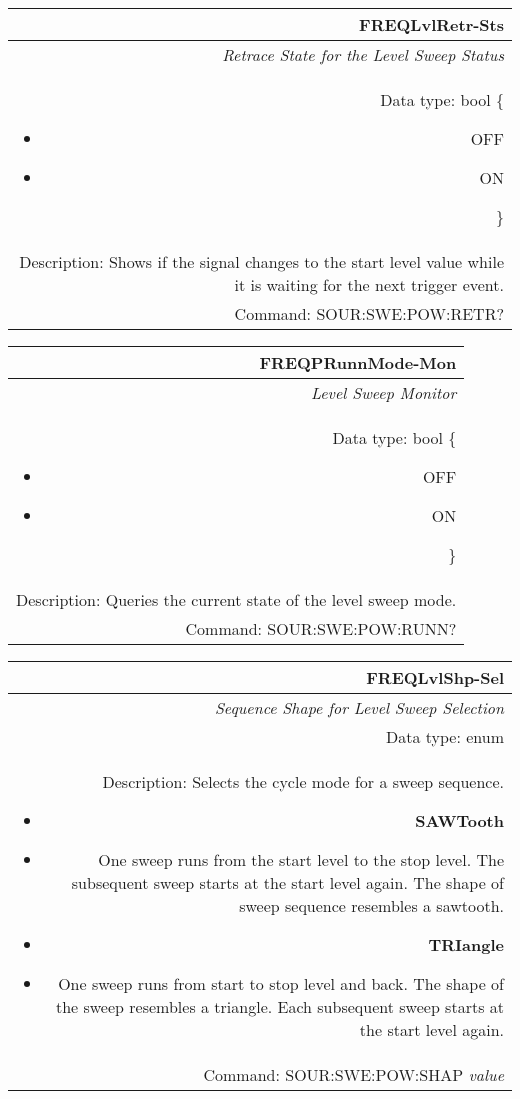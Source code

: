 \documentclass[openany]{article}
\begin{document}
		\begin{tabular}{N}
			\hline
			\bfseries FREQLvlRetr-Sts \\ \hline
			\emph{Retrace State for the Level Sweep Status} \\
			Data type: bool \{\begin{itemize}[noitemsep]
				\small
				\item[] OFF
				\item[] ON
			\end{itemize}\} \\
			Description: Shows if the signal changes to the start level value while it is waiting for the next trigger event. \\
			Command: SOUR:SWE:POW:RETR? \\
			
		\end{tabular}
%
		\begin{tabular}{N}
			\hline
			\bfseries FREQPRunnMode-Mon \\ \hline
			\emph{Level Sweep Monitor} \\
			Data type: bool \{\begin{itemize}[noitemsep]
				\small
				\item[] OFF
				\item[] ON
			\end{itemize}\} \\
			Description: Queries the current state of the level sweep mode. \\
			Command: SOUR:SWE:POW:RUNN? \\
			
		\end{tabular}
%
		\begin{tabular}{N}
			\hline
			\bfseries FREQLvlShp-Sel \\ \hline
			\emph{Sequence Shape for Level Sweep Selection} \\
			Data type: enum \\
			Description: Selects the cycle mode for a sweep sequence.\begin{itemize}[noitemsep]
				\small
				\item[] \textbf{SAWTooth} 
				\item[] One sweep runs from the start level to the stop level. The subsequent sweep starts at the start level again. The shape of sweep sequence resembles a sawtooth.
				\item[] \textbf{TRIangle}
				\item[] One sweep runs from start to stop level and back. The shape of the sweep resembles a triangle. Each subsequent sweep starts at the start level again.			
			\end{itemize} \\
			Command: SOUR:SWE:POW:SHAP \emph{value} \\

		\end{tabular}
\end{document}

